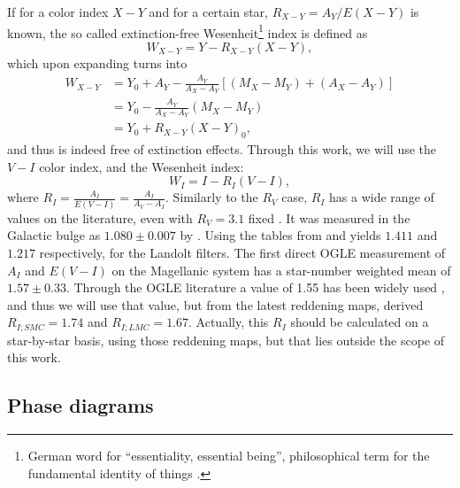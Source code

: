 	If for a color index $X-Y$ and for a certain star, $R_{X-Y} = A_Y/E(X-Y)$ is known, 
	the so called extinction-free Wesenheit\footnote{
		German word for \enquote{essentiality, essential being}, 
		philosophical term for the fundamental identity of things \citep[page 341]{German1997}.
	}
	index \citep{Madore1982} is defined as
	\begin{equation}
		W_{X-Y} = Y - R_{X-Y} (X-Y), \label{eq:wesenheit}
	\end{equation}
	which upon expanding turns into
	\begin{align*}
		W_{X-Y} &= Y_0 + A_Y - \frac{A_Y}{A_X - A_Y}[ (M_X-M_Y) + (A_X - A_Y) ] \\ 
		&= Y_0 - \frac{A_Y}{A_X - A_Y} (M_X-M_Y)  \\ 
		&= Y_0 + R_{X-Y}(X-Y)_0, 
	\end{align*}
	and thus is indeed free of extinction effects. Through this work, we will use the $V-I$ color index, and the Wesenheit index:
	\begin{equation}
	W_I = I - R_I (V-I), \label{eq:wesenheit-i}
	\end{equation}
	where $R_I = \frac{A_I}{E(V-I)} = \frac{A_I}{A_V - A_I}$. 
	Similarly to the $R_V$ case, $R_I$ has a wide range of values on the literature, even with $R_V=3.1$ fixed \citep[for a discussion see][]{Nataf2015}. 
	It was measured in the Galactic bulge as $1.080\pm0.007$ by \cite{Pietrukowicz2012}. 
	Using the tables from \cite{Schlegel1998} and \cite{Schlafly2011} yields $1.411$ and $1.217$ respectively, for the Landolt filters.
	The first direct OGLE measurement of $A_I$ and $E(V-I)$ on the Magellanic system has a star-number weighted mean of $1.57\pm0.33$.
	Through the OGLE literature a value of 1.55 has been widely used \citep[see for instance][]{OGLE2015,Udalski1999,Ulaczyk2013},
	and thus we will use that value,
	but from the latest reddening maps, \cite{Reddening2021} derived $R_{I;SMC}=1.74$ and $R_{I;LMC}=1.67$.
	Actually, this $R_I$ should be calculated on a star-by-star basis, using those reddening maps,
	but that lies outside the scope of this work.
	
\subsection{Phase diagrams}

